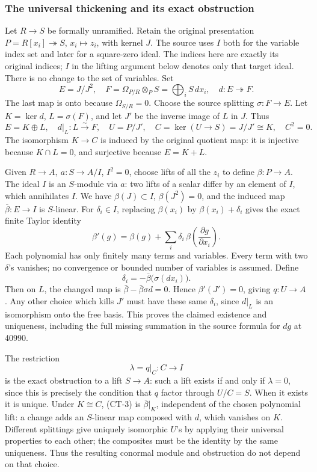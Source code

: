 \subsubsection{The universal thickening and its exact obstruction}\label{the-universal-thickening-and-its-exact-obstruction}

Let \(R\to S\) be formally unramified. Retain the original presentation \(P=R[x_i]\twoheadrightarrow S\), \(x_i\mapsto z_i\), with kernel \(J\). The source uses \(I\) both for the variable index set and later for a square-zero ideal. The indices here are exactly its original indices; \(I\) in the lifting argument below denotes only that target ideal. There is no change to the set of variables. Set \[
E=J/J^2,\quad F=\Omega_{P/R}\otimes_PS=\bigoplus_iS\,dx_i,\quad
d:E\twoheadrightarrow F.
\] The last map is onto because \(\Omega_{S/R}=0\). Choose the source splitting \(\sigma:F\to E\). Let \(K=\ker d\), \(L=\sigma(F)\), and let \(J'\) be the inverse image of \(L\) in \(J\). Thus \[
E=K\oplus L,\quad d|_L:L\xrightarrow{\sim}F,\quad
U=P/J',\quad C=\ker(U\to S)=J/J'\cong K,\quad C^2=0.
\tag{CT-1}
\] The isomorphism \(K\to C\) is induced by the original quotient map: it is injective because \(K\cap L=0\), and surjective because \(E=K+L\).

Given \(R\to A,\ a:S\to A/I\), \(I^2=0\), choose lifts of all the \(z_i\) to define \(\beta:P\to A\). The ideal \(I\) is an \(S\)-module via \(a\): two lifts of a scalar differ by an element of \(I\), which annihilates \(I\). We have \(\beta(J)\subset I\), \(\beta(J^2)=0\), and the induced map \(\bar\beta:E\to I\) is \(S\)-linear. For \(\delta_i\in I\), replacing \(\beta(x_i)\) by \(\beta(x_i)+\delta_i\) gives the exact finite Taylor identity \[
\beta'(g)=\beta(g)+\sum_i\delta_i\,
\beta\!\left(\frac{\partial g}{\partial x_i}\right).
\tag{CT-2}
\] Each polynomial has only finitely many terms and variables. Every term with two \(\delta\)'s vanishes; no convergence or bounded number of variables is assumed. Define \[
\delta_i=-\bar\beta\bigl(\sigma(dx_i)\bigr).
\] Then on \(L\), the changed map is \(\bar\beta-\bar\beta\sigma d=0\). Hence \(\beta'(J')=0\), giving \(q:U\to A\). Any other choice which kills \(J'\) must have these same \(\delta_i\), since \(d|_L\) is an isomorphism onto the free basis. This proves the claimed existence and uniqueness, including the full missing summation in the source formula for \(dg\) at 40990.

The restriction \[
\lambda=q|_C:C\longrightarrow I
\tag{CT-3}
\] is the exact obstruction to a lift \(S\to A\): such a lift exists if and only if \(\lambda=0\), since this is precisely the condition that \(q\) factor through \(U/C=S\). When it exists it is unique. Under \(K\cong C\), (CT-3) is \(\bar\beta|_K\), independent of the chosen polynomial lift: a change adds an \(S\)-linear map composed with \(d\), which vanishes on \(K\). Different splittings give uniquely isomorphic \(U\)'s by applying their universal properties to each other; the composites must be the identity by the same uniqueness. Thus the resulting conormal module and obstruction do not depend on that choice.


